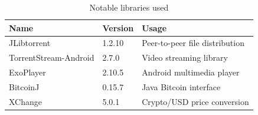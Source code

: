 \begin{table}[]
\begin{tabular}{|l|l|l|}
\hline
Name                  & Version & Usage                          \\ \hline
JLibtorrent           & 1.2.10  & Peer-to-peer file distribution \\ \hline
TorrentStream-Android & 2.7.0   & Video streaming library        \\ \hline
ExoPlayer             & 2.10.5  & Android multimedia player      \\ \hline
BitcoinJ              & 0.15.7  & Java Bitcoin interface         \\ \hline
XChange               & 5.0.1   & Crypto/USD price conversion    \\ \hline
\end{tabular}
\caption{Notable libraries used}
\label{tab:library-usage}
\end{table}

